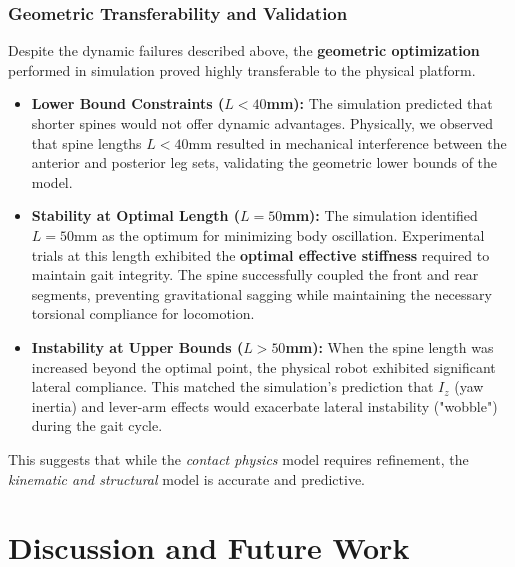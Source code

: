 \documentclass[11pt, a4paper]{article}
\begin{document}
\subsubsection{Geometric Transferability and Validation}
Despite the dynamic failures described above, the \textbf{geometric optimization} performed in simulation proved highly transferable to the physical platform.
\begin{itemize}
    \item \textbf{Lower Bound Constraints ($L < 40$mm):} The simulation predicted that shorter spines would not offer dynamic advantages. Physically, we observed that spine lengths $L < 40$mm resulted in mechanical interference between the anterior and posterior leg sets, validating the geometric lower bounds of the model.
    \item \textbf{Stability at Optimal Length ($L = 50$mm):} The simulation identified $L=50$mm as the optimum for minimizing body oscillation. Experimental trials at this length exhibited the \textbf{optimal effective stiffness} required to maintain gait integrity. The spine successfully coupled the front and rear segments, preventing gravitational sagging while maintaining the necessary torsional compliance for locomotion.
    \item \textbf{Instability at Upper Bounds ($L > 50$mm):} When the spine length was increased beyond the optimal point, the physical robot exhibited significant lateral compliance. This matched the simulation's prediction that $I_z$ (yaw inertia) and lever-arm effects would exacerbate lateral instability ("wobble") during the gait cycle. 
\end{itemize}
This suggests that while the \textit{contact physics} model requires refinement, the \textit{kinematic and structural} model is accurate and predictive.
\section{Discussion and Future Work}
\label{sec:discussion}
\end{document}
